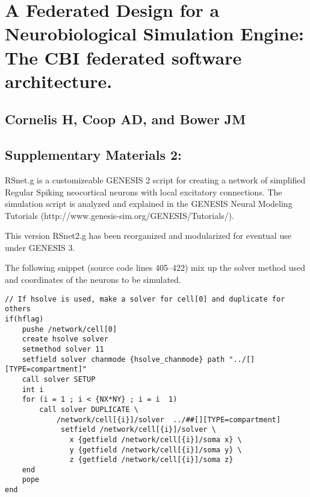 \documentclass[10pt]{article}
\begin{document}
\section*{A Federated Design for a Neurobiological Simulation Engine: 
The CBI federated software architecture.}
\subsection*{Cornelis H, Coop AD, and Bower JM}
\subsection*{Supplementary Materials 2:} 

RSnet.g is a customizeable GENESIS 2 script for creating a network of simplified
Regular Spiking neocortical neurons with local excitatory connections.
The simulation script is analyzed and explained in the GENESIS Neural
Modeling Tutorials (http://www.genesis-sim.org/GENESIS/Tutorials/).

This version RSnet2.g has been reorganized and modularized for
eventual use under GENESIS 3.

The following snippet (source code lines 405--422) mix up the solver method used and coordinates of the neurons to be simulated.

\linenumbers
\begin{verbatim}
// If hsolve is used, make a solver for cell[0] and duplicate for others
if(hflag)
    pushe /network/cell[0]
    create hsolve solver
    setmethod solver 11 
    setfield solver chanmode {hsolve_chanmode} path "../[][TYPE=compartment]"
    call solver SETUP
    int i
    for (i = 1 ; i < {NX*NY} ; i = i  1)
        call solver DUPLICATE \
            /network/cell[{i}]/solver  ../##[][TYPE=compartment]
             setfield /network/cell[{i}]/solver \
               x {getfield /network/cell[{i}]/soma x} \
               y {getfield /network/cell[{i}]/soma y} \
               z {getfield /network/cell[{i}]/soma z}
    end
    pope
end
\end{verbatim}
\end{document}
